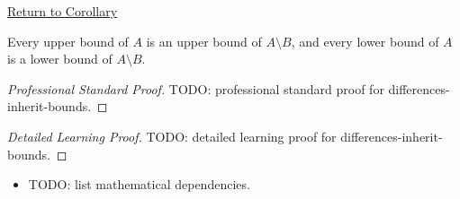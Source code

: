 \newpage
{}
\label{prf:differences-inherit-bounds}

\begin{remark*}[Return]
\hyperref[cor:differences-inherit-bounds]{Return to Corollary}
\end{remark*}

\begin{corollary*}
Every upper bound of $A$ is an upper bound of $A\setminus B$, and every lower
bound of $A$ is a lower bound of $A\setminus B$.
\end{corollary*}

\begin{proof}[Professional Standard Proof]
\LRAProofBodyStart
TODO: professional standard proof for differences-inherit-bounds.
\end{proof}

\begin{proof}[Detailed Learning Proof]
\LRAProofBodyStart
TODO: detailed learning proof for differences-inherit-bounds.
\end{proof}

\begin{remark*}
\end{remark*}

\begin{dependencies}
\begin{itemize}
  \item TODO: list mathematical dependencies.
\end{itemize}
\end{dependencies}

\clearpage
